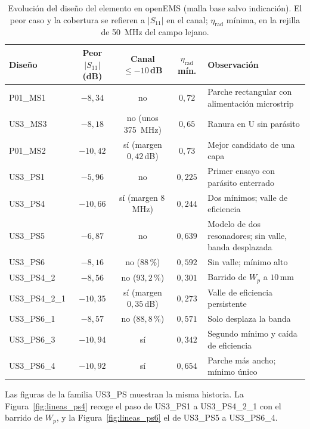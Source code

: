 \documentclass[11pt,a4paper]{article}
\begin{document}
\begin{table}[H]
    \centering
    \caption{Evolución del diseño del elemento en openEMS (malla base salvo indicación). El peor caso
    y la cobertura se refieren a $|S_{11}|$ en el canal; $\eta_\mathrm{rad}$ mínima, en la rejilla de
    \SI{50}{MHz} del campo lejano.}
    \label{tab:evolucion}
    {\small
    \begin{tabularx}{\textwidth}{l c c c X}
        \toprule
        Diseño & Peor $|S_{11}|$ (\si{dB}) & Canal $\le -10$\,\si{dB} & $\eta_\mathrm{rad}$ mín. & Observación \\
        \midrule
        P01\_MS1 & $-8{,}34$ & no & $0{,}72$ & Parche rectangular con alimentación microstrip \\
        US3\_MS3 & $-8{,}18$ & no (unos \SI{375}{MHz}) & $0{,}65$ & Ranura en U sin parásito \\
        P01\_MS2 & $-10{,}42$ & sí (margen $0{,}42$\,dB) & $0{,}73$ & Mejor candidato de una capa \\
        US3\_PS1 & $-5{,}96$ & no & $0{,}225$ & Primer ensayo con parásito enterrado \\
        US3\_PS4 & $-10{,}66$ & sí (margen $8$\,MHz) & $0{,}244$ & Dos mínimos; valle de eficiencia \\
        US3\_PS5 & $-6{,}87$ & no & $0{,}639$ & Modelo de dos resonadores; sin valle, banda desplazada \\
        US3\_PS6 & $-8{,}16$ & no ($88$\,\%) & $0{,}592$ & Sin valle; mínimo alto \\
        US3\_PS4\_2 & $-8{,}56$ & no ($93{,}2$\,\%) & $0{,}301$ & Barrido de $W_p$ a $10$\,mm \\
        US3\_PS4\_2\_1 & $-10{,}35$ & sí (margen $0{,}35$\,dB) & $0{,}273$ & Valle de eficiencia persistente \\
        US3\_PS6\_1 & $-8{,}57$ & no ($88{,}8$\,\%) & $0{,}571$ & Solo desplaza la banda \\
        US3\_PS6\_3 & $-10{,}94$ & sí & $0{,}342$ & Segundo mínimo y caída de eficiencia \\
        US3\_PS6\_4 & $-10{,}92$ & sí & $0{,}654$ & Parche más ancho; mínimo único \\
        \bottomrule
    \end{tabularx}
    }
\end{table}

Las figuras de la familia US3\_PS muestran la misma historia. La Figura~\ref{fig:lineas_ps4} recoge
el paso de US3\_PS1 a US3\_PS4\_2\_1 con el barrido de $W_p$, y la Figura~\ref{fig:lineas_ps6} el de
US3\_PS5 a US3\_PS6\_4.
\end{document}
